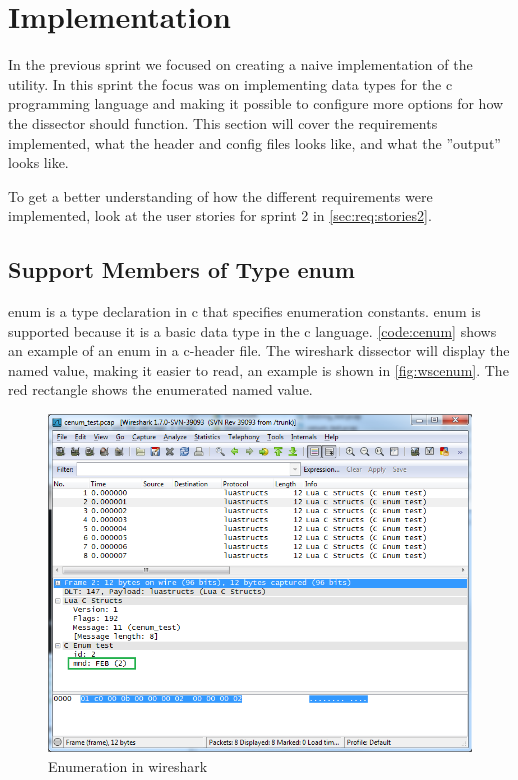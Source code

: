 \section{Implementation}
\label{sec:sp2:impl}
In the previous sprint we focused on creating a naive implementation of the 
\gls{utility}. In this sprint the focus was on implementing data types for the 
\Gls{c} programming language and making it possible to configure more options for how 
the \gls{dissector} should function. This section will cover the requirements 
implemented, what the \gls{header} and config files looks like, and what the ''output'' looks like.

To get a better understanding of how the different requirements were implemented,
look at the user stories for sprint 2 in \autoref{sec:req:stories2}.

\subsection{Support Members of Type \Gls{enum}}

\label{sec:supportenum}
\Gls{enum} is a type declaration in \Gls{c} that specifies enumeration constants. \Gls{enum} 
is supported because it is a basic data type in the \Gls{c} language. 
\autoref{code:cenum} shows an example of an \gls{enum} in a \Gls{c}-\gls{header} file. The 
\Gls{wireshark} \gls{dissector} will display the named value, making it 
easier to read, an example is shown in \autoref{fig:wscenum}. The red 
rectangle shows the \gls{enumerated named value}.

\begin{figure}[ht]
	\center
	\includegraphics[width=\textwidth]{./sprints/img/wireshark_cenum}
	\caption{Enumeration in \Gls{wireshark}\label{fig:wscenum}}
\end{figure}

